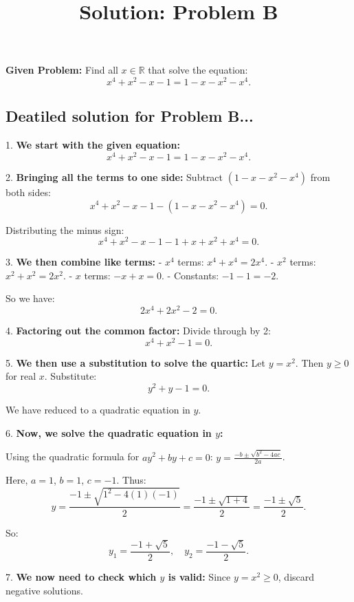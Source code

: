 \documentclass[12pt,a4paper]{article}
\begin{document}
\title{Solution: Problem B}
\date{}
\maketitle
\thispagestyle{fancy}


\noindent\textbf{Given Problem:} Find all $x \in \mathbb{R}$ that solve the equation:
\[
x^4 + x^2 - x - 1 = 1 - x - x^2 - x^4.
\]


\subsection*{Deatiled solution for Problem B...}

1. \textbf{We start with the given equation:}
\[
x^4 + x^2 - x - 1 = 1 - x - x^2 - x^4.
\]

2. \textbf{Bringing all the terms to one side:}  
Subtract $(1 - x - x^2 - x^4)$ from both sides:
\[
x^4 + x^2 - x - 1 - (1 - x - x^2 - x^4) = 0.
\]

Distributing the minus sign:
\[
x^4 + x^2 - x - 1 - 1 + x + x^2 + x^4 = 0.
\]

3. \textbf{We then combine like terms:}
- $x^4$ terms: $x^4 + x^4 = 2x^4$.
- $x^2$ terms: $x^2 + x^2 = 2x^2$.
- $x$ terms: $-x + x = 0$.
- Constants: $-1 -1 = -2$.

So we have:
\[
2x^4 + 2x^2 - 2 = 0.
\]

4. \textbf{Factoring out the common factor:}  
Divide through by 2:
\[
x^4 + x^2 - 1 = 0.
\]

5. \textbf{We then use a substitution to solve the quartic:}  
Let $y = x^2$. Then $y \geq 0$ for real $x$. Substitute:
\[
y^2 + y - 1 = 0.
\]

We have reduced to a quadratic equation in $y$.

\bigskip

6. \textbf{Now, we solve the quadratic equation in $y$:}

\bigskip

Using the quadratic formula for $ay^2+by+c=0$: $y=\frac{-b \pm \sqrt{b^2-4ac}}{2a}$.

\bigskip

Here, $a=1$, $b=1$, $c=-1$. Thus:
\[
y = \frac{-1 \pm \sqrt{1^2 -4(1)(-1)}}{2} = \frac{-1 \pm \sqrt{1+4}}{2} = \frac{-1 \pm \sqrt{5}}{2}.
\]

So:
\[
y_1 = \frac{-1 + \sqrt{5}}{2}, \quad y_2 = \frac{-1 - \sqrt{5}}{2}.
\]

\bigskip

7. \textbf{We now need to check which $y$ is valid:}  
Since $y=x^2 \geq 0$, discard negative solutions.
\end{document}
